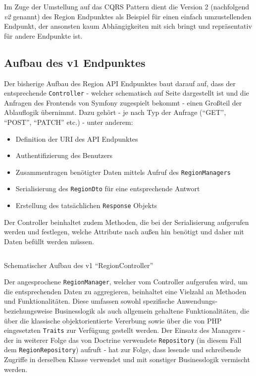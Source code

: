 \documentclass[a4paper,12pt,twoside]{scrreprt}
\begin{document}
\smallskip

Im Zuge der Umstellung auf das CQRS Pattern dient die Version 2 (nachfolgend \textit{v2} genannt) des Region Endpunktes als Beispiel für einen einfach umzustellenden Endpunkt, der ansonsten kaum Abhängigkeiten mit sich bringt und repräsentativ für andere Endpunkte ist.

\subsection{Aufbau des v1 Endpunktes}
\label{sub-sec:region-aufbau-v1}
Der bisherige Aufbau des Region API Endpunktes baut darauf auf, dass der entsprechende \texttt{Controller} - welcher schematisch auf Seite \pageref{code:region-controller-v1} dargestellt ist und die Anfragen des Frontends von Symfony zugespielt bekommt - einen Großteil der Ablauflogik übernimmt. Dazu gehört - je nach Typ der Anfrage (\enquote{GET}, \enquote{POST}, \enquote{PATCH} etc.) - unter anderem:

\begin{itemize}
    \item Definition der URI des API Endpunktes
    \item Authentifizierung des Benutzers
    \item Zusammentragen benötigter Daten mittels Aufruf des \texttt{RegionManagers}
    \item Serialisierung des \texttt{RegionDto} für eine entsprechende Antwort
    \item Erstellung des tatsächlichen \texttt{Response} Objekts
\end{itemize}

\noindent Der Controller beinhaltet zudem Methoden, die bei der Serialisierung aufgerufen werden und festlegen, welche Attribute nach außen hin benötigt und daher mit Daten befüllt werden müssen.

\begin{listing}[ht]
    \inputminted[fontsize=\footnotesize,linenos,breaklines]{php}{code/region_controller_v1.php}
    \caption[Schematischer Aufbau des v1 \enquote{RegionController}]{Schematischer Aufbau des v1 \enquote{RegionController}}
    \label{code:region-controller-v1}
\end{listing}

\smallskip

Der angesprochene \texttt{RegionManager}, welcher vom Controller aufgerufen wird, um die entsprechenden Daten zu aggregieren, beinhaltet eine Vielzahl an Methoden und Funktionalitäten. Diese umfassen sowohl spezifische Anwendungs- beziehungsweise Businesslogik als auch allgemein gehaltene Funktionalitäten, die über die klassische objektorientierte Vererbung sowie über die von PHP eingesetzten \texttt{Traits} zur Verfügung gestellt werden. Der Einsatz des Managers - der in weiterer Folge das von Doctrine verwendete \texttt{Repository} (in diesem Fall dem \texttt{RegionRepository}) aufruft - hat zur Folge, dass lesende und schreibende Zugriffe in derselben Klasse verwendet und mit sonstiger Businesslogik vermischt werden.
\end{document}
